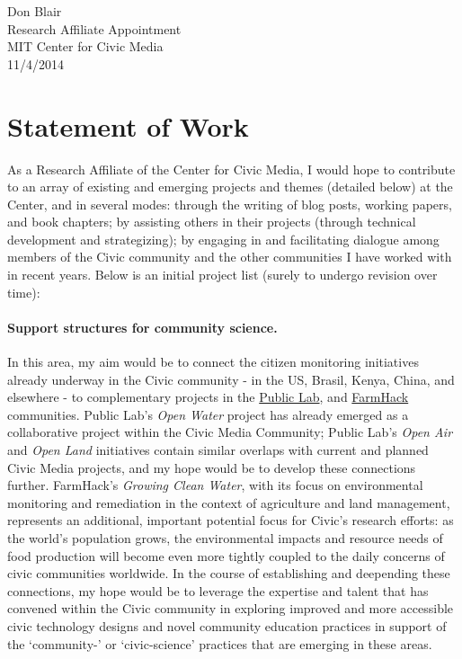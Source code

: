 \documentclass[10pt]{article}
\begin{document}
\setlength\parindent{0pt}

Don Blair\\
Research Affiliate Appointment \\
MIT Center for Civic Media \\
11/4/2014


\section*{Statement of Work}


As a Research Affiliate of the Center for Civic Media, I would hope to contribute to an array of existing and emerging projects and themes (detailed below) at the Center, and in several modes: through the writing of blog posts, working papers, and book chapters; by assisting others in their projects (through technical development and strategizing); by engaging in and facilitating dialogue among members of the Civic community and the other communities I have worked with in recent years.  Below is an initial project list  (surely to undergo revision over time):

\paragraph{Support structures for community science.} In this area, my aim would be to connect the citizen monitoring initiatives already underway in the Civic community - in the US, Brasil, Kenya, China, and elsewhere -  to complementary projects in the \href{http://publiclab.org}{Public Lab}, and \href{http://FarmHack}{FarmHack} communities.  Public Lab's \emph{Open Water} project has already emerged as a collaborative project within the Civic Media Community; Public Lab's \emph{Open Air} and \emph{Open Land} initiatives contain similar overlaps with current and planned Civic Media projects, and my hope would be to develop these connections further. FarmHack's \emph{Growing Clean Water}, with its focus on environmental monitoring and remediation in the context of agriculture and land management, represents an additional,  important potential focus for Civic's research efforts: as the world's population grows, the environmental impacts and resource needs of food production will become even more tightly coupled to the daily concerns of civic communities worldwide.  In the course of establishing and deepending these connections, my hope would be to leverage the expertise and talent that has convened within the Civic community in exploring improved and more accessible civic technology designs and novel community education practices in support of the `community-' or `civic-science' practices that are emerging in these areas.  
\end{document}
